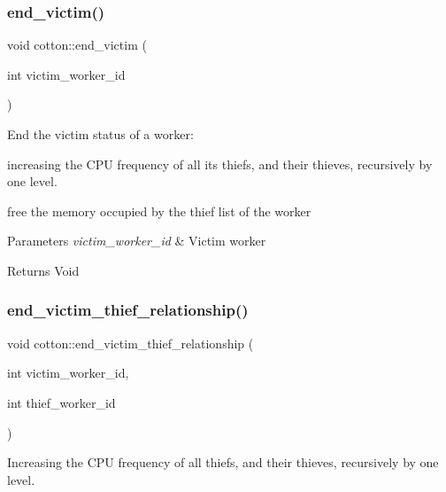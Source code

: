 \subsubsection{\texorpdfstring{end\+\_\+victim()}{end\_victim()}}
{\footnotesize\ttfamily void cotton\+::end\+\_\+victim (\begin{DoxyParamCaption}\item[{int}]{victim\+\_\+worker\+\_\+id }\end{DoxyParamCaption})}

End the victim status of a worker\+:
\begin{DoxyItemize}
\item increasing the C\+PU frequency of all its thiefs, and their thieves, recursively by one level.
\item free the memory occupied by the thief list of the worker
\end{DoxyItemize}


\begin{DoxyParams}{Parameters}
{\em victim\+\_\+worker\+\_\+id} & Victim worker\\
\hline
\end{DoxyParams}
\begin{DoxyReturn}{Returns}
Void 
\end{DoxyReturn}
\mbox{\label{cotton-runtime_8h_file_a2faa5f098d14f1a3319101ff735bf016}} 
\subsubsection{\texorpdfstring{end\+\_\+victim\+\_\+thief\+\_\+relationship()}{end\_victim\_thief\_relationship()}}
{\footnotesize\ttfamily void cotton\+::end\+\_\+victim\+\_\+thief\+\_\+relationship (\begin{DoxyParamCaption}\item[{int}]{victim\+\_\+worker\+\_\+id,  }\item[{int}]{thief\+\_\+worker\+\_\+id }\end{DoxyParamCaption})}

Increasing the C\+PU frequency of all thiefs, and their thieves, recursively by one level.



